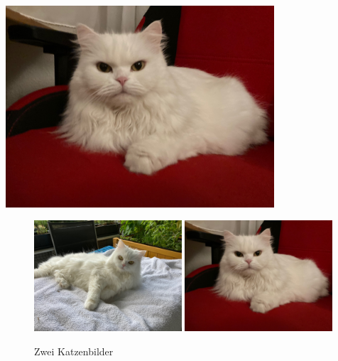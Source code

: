 \begin{center}
\includegraphics[width=0.75\textwidth,angle=45]{../Bilder/Katze2}
\label{fig:katze3}
\end{center}


\blindtext[2]


\blindtext[2]

\begin{figure}
\centering
{}
{\includegraphics[width=0.49\textwidth]{../Bilder/Katze1}}
{\includegraphics[width=0.49\textwidth]{../Bilder/Katze2}}
\caption{Zwei Katzenbilder}\label{katzenbilder}
\end{figure}







